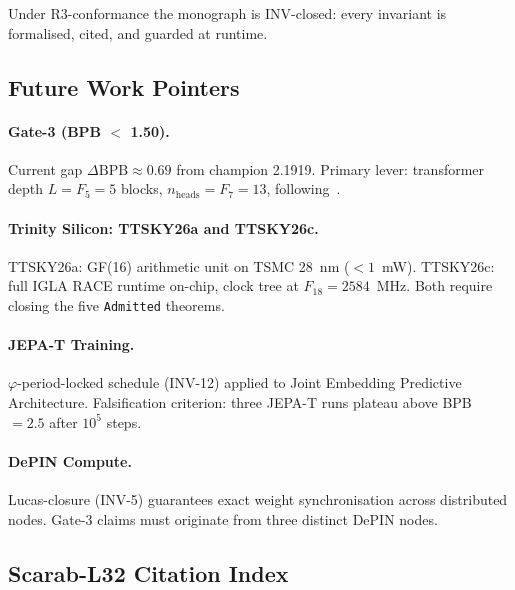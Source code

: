 \begin{corollary}
\label{cor:scarab-inv-closure}
  Under R3-conformance the monograph is INV-closed:
  every invariant is formalised, cited, and guarded at runtime.
\end{corollary}

\subsection{Future Work Pointers}
\label{sec:scarab-future-work}

\paragraph{Gate-3 (BPB $<$ 1.50).}
Current gap $\Delta\mathrm{BPB}\approx 0.69$ from champion 2.1919.
Primary lever: transformer depth $L=F_{5}=5$ blocks,
$n_{\mathrm{heads}}=F_{7}=13$, following~\cite{vaswani_attention}.

\paragraph{Trinity Silicon: TTSKY26a and TTSKY26c.}
TTSKY26a: GF(16) arithmetic unit on TSMC 28~nm ($<1$~mW).
TTSKY26c: full IGLA RACE runtime on-chip, clock tree at
$F_{18}=2584$~MHz.
Both require closing the five \texttt{Admitted} theorems.

\paragraph{JEPA-T Training.}
$\varphi$-period-locked schedule (INV-12) applied to
Joint Embedding Predictive Architecture.
Falsification criterion: three JEPA-T runs plateau
above BPB~$= 2.5$ after $10^{5}$ steps.

\paragraph{DePIN Compute.}
Lucas-closure (INV-5) guarantees exact weight synchronisation
across distributed nodes.
Gate-3 claims must originate from three distinct DePIN nodes.

\subsection{Scarab-L32 Citation Index}
\label{sec:scarab-citations}

